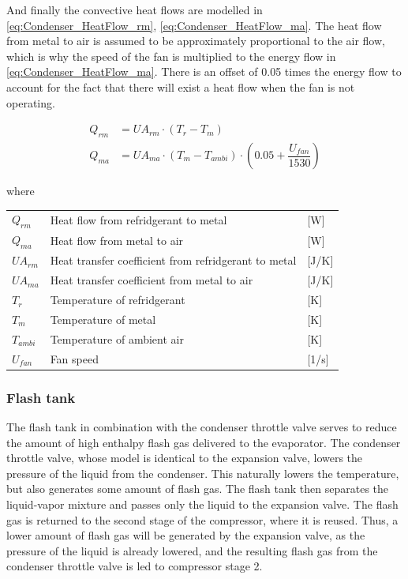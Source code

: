 And finally the convective heat flows are modelled in \cref{eq:Condenser_HeatFlow_rm}, \cref{eq:Condenser_HeatFlow_ma}. The heat flow from metal to air is assumed to be approximately proportional to the air flow, which is why the speed of the fan is multiplied to the energy flow in \cref{eq:Condenser_HeatFlow_ma}. There is an offset of 0.05 times the energy flow to account for the fact that there will exist a heat flow when the fan is not operating.

\begin{align}
	Q_{rm}	 			& = U A_{rm} \cdot (T_r - T_m)							\label{eq:Condenser_HeatFlow_rm}\\
	Q_{ma}	 			& = U A_{ma} \cdot (T_m - T_{ambi})\cdot (0.05 + \dfrac{U_{fan}}{1530})				\label{eq:Condenser_HeatFlow_ma}
\end{align}

where

\begin{center}
	\begin{tabular}{l p{8cm} l}
		$Q_{rm}$				&	Heat flow from refridgerant to metal					& [\si{W}] \\
		$Q_{ma}$				&	Heat flow from metal to air								& [\si{W}] \\
		$U A_{rm}$				& 	Heat transfer coefficient from refridgerant to metal 	& [\si{J}/\si{K}] \\
		$U A_{ma}$				& 	Heat transfer coefficient from metal to air				& [\si{J}/\si{K}] \\
		$T_r$					& 	Temperature of refridgerant 							& [\si{K}] \\
		$T_m$					&	Temperature of metal 									& [\si{K}] \\
		$T_{ambi}$				&	Temperature of ambient air 								& [\si{K}] \\
		$U_{fan}$				&	Fan speed												& [1/\si{s}] \\
	\end{tabular}
\end{center}



\subsubsection{Flash tank}
The flash tank in combination with the condenser throttle valve serves to reduce the amount of high enthalpy flash gas delivered to the evaporator. The condenser throttle valve, whose model is identical to the expansion valve, lowers the pressure of the liquid from the condenser. This naturally lowers the temperature, but also generates some amount of flash gas. The flash tank then separates the liquid-vapor mixture and passes only the liquid to the expansion valve. The flash gas is returned to the second stage of the compressor, where it is reused. Thus, a lower amount of flash gas will be generated by the expansion valve, as the pressure of the liquid is already lowered, and the resulting flash gas from the condenser throttle valve is led to compressor stage 2.

